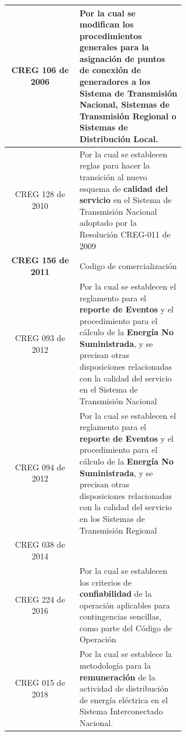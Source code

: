 \documentclass[a5paper]{book}%
\begin{document}
\begin{longtable}{|c|p{0.6\linewidth}|}
	CREG 106 de 2006&Por la cual se modifican los procedimientos generales para la
	asignación de\textbf{ puntos de conexión de
		generadores} a los Sistema de Transmisión Nacional,
	Sistemas de Transmisión Regional o Sistemas de
	Distribución Local.\\\hline
	
	
	
	CREG 128 de 2010& Por la cual se establecen reglas para hacer la transición al nuevo esquema de
	\textbf{calidad del servicio} en el Sistema de Transmisión Nacional adoptado por la
	Resolución CREG-011 de 2009\\\hline
	
	\textbf{CREG 156 de 2011}& Codigo de comercialización \\\hline
	
	CREG 093 de 2012& Por la cual se establecen el reglamento para el \textbf{reporte de Eventos }y el procedimiento
	para el cálculo de la \textbf{Energía No Suministrada}, y se precisan otras disposiciones relacionadas con la calidad del servicio en el Sistema de Transmisión Nacional\\\hline
	
	CREG 094 de 2012& Por la cual se establecen el reglamento para el \textbf{reporte de Eventos} y el procedimiento para el cálculo de la \textbf{Energía No Suministrada}, y se precisan
	otras disposiciones relacionadas con la calidad del servicio en los Sistemas de Transmisión Regional\\\hline
	
	CREG 038 de 2014& \\\hline  
	CREG 224 de 2016& Por la cual se establecen los criterios de
	\textbf{confiabilidad} de la operación aplicables
	para contingencias sencillas, como parte del Código
	de Operación\\\hline
	
	CREG 015 de 2018& Por la cual se establece la metodología para la \textbf{remuneración} de la actividad de
	distribución de energía eléctrica en el Sistema Interconectado
	Nacional.\\\hline
	

\end{longtable}
\end{document}
